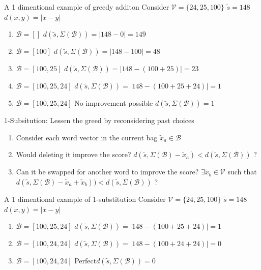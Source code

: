 \documentclass[]{beamer}
\newcommand{\s}{\tilde{s}}
\newcommand{\x}{\tilde{x}}
\newcommand{\V}{\mathcal{V}}
\renewcommand{\B}{\mathcal{B}}
\begin{document}
\begin{frame}{A 1 dimentional example of greedy additon}
	\vectorselectionproblemdefnalt
	\vfill
	Consider $\V=\{24,25,100\}$ \hfill $\s=148$ \hfill $d(x,y)=|x-y|$
	\begin{enumerate}
		\item<1-> $\B=[]$ \hfill $d(\s,\Sigma(\B))=|148-0|=149$ 
		\item<2-> $\B=[100]$ \hfill $d(\s,\Sigma(\B))=|148-100|=48$ 
		\item<3-> $\B=[100,25]$ \hfill $d(\s,\Sigma(\B))=|148-(100+25)|=23$ 
		\item<4-> $\B=[100,25,24]$ \hfill $d(\s,\Sigma(\B))=|148-(100+25+24)|=1$ 
		\item<5-> $\B=[100,25,24]$ \hfill No improvement possible \hfill $d(\s,\Sigma(\B))=1$ 
	\end{enumerate}
	\vfill
	\vfill
\end{frame}

\begin{frame}{1-Subsitution: Lessen the greed by reconsidering past choices}
	\vectorselectionproblemdefnalt
	\vfill
	\begin{enumerate}
		\item Consider each word vector in the current bag $\x_a\in\B$
		\item Would deleting it improve the score? $d(\s,\Sigma(\B)-\x_a)<d(\s,\Sigma(\B))$ ?
		\item Can it be swapped for another word to improve the score?
		$\exists \x_b\in\V$ such that
		$d(\s,\Sigma(\B)-\x_a+\x_b))<d(\s,\Sigma(\B))$ ?
	\end{enumerate}
\end{frame}

\begin{frame}{A 1 dimentional example of 1-substitution}
	\vectorselectionproblemdefnalt
	\vfill
	Consider $\V=\{24,25,100\}$ \hfill $\s=148$ \hfill $d(x,y)=|x-y|$
	\begin{enumerate}
		\item<1-> $\B=[100,25,24]$ \hfill $d(\s,\Sigma(\B))=|148-(100+25+24)|=1$ 
		\item<2-> $\B=[100,24,24]$ \hfill $d(\s,\Sigma(\B))=|148-(100+24+24)|=0$ 
		\item<3-> $\B=[100,24,24]$ \hfill Perfect\hfill $d(\s,\Sigma(\B))=0$ 
	\end{enumerate}
	\vfill
	\vfill
\end{frame}
\end{document}
